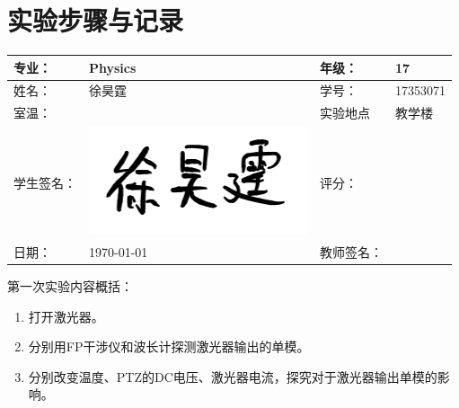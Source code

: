 \documentclass[10pt,a4paper]{ctexart}
\begin{document}
\section{实验步骤与记录}
\begin{center}
\begin{tabular}{|p{8em}|p{8em}|p{8em}|p{8em}|}
	\hline 
	专业：     &Physics       &年级：      & 17     \\
	\hline
	姓名：& 徐昊霆 &学号：&17353071  \\
	\hline
	室温：&                    &实验地点 & 教学楼 \\
	\hline	
	学生签名： &\includegraphics[scale=0.2]{sign} & 评分： & \\
	\hline
	日期： & \today & 教师签名：&  \\
	\hline
\end{tabular}
\end{center}
第一次实验内容概括：
\begin{enumerate}
	\item 打开激光器。
	\item 分别用FP干涉仪和波长计探测激光器输出的单模。
	\item 分别改变温度、PTZ的DC电压、激光器电流，探究对于激光器输出单模的影响。
\end{enumerate}
\end{document}
